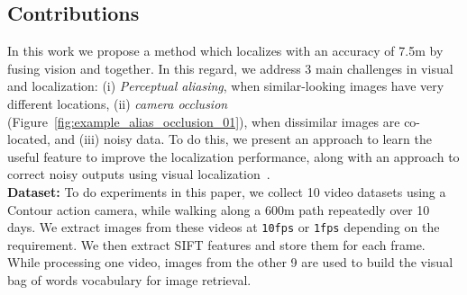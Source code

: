 \subsection{Contributions}
In this work we propose a method which localizes with an
accuracy of 7.5m by fusing vision and \gps together. 
In this regard, we address 3 main challenges in visual and \gps
localization: (i) \emph{Perceptual aliasing}, when similar-looking images
have very different \gps locations, (ii) \emph{camera occlusion}
(Figure~\ref{fig:example_alias_occlusion_01}), when dissimilar images
are co-located, and (iii) noisy \gps data. To do this, we present an approach to learn the useful feature \cite{turcot2009better,knopp2010avoiding} to improve the localization performance, along with an approach to correct noisy \gps outputs using visual localization~\cite{Zamir_2014_CVPR}.\\

\textbf{Dataset:} To do experiments in this paper, we collect
10 video datasets using a Contour action camera, while walking
along a 600m path repeatedly over 10 days. We extract images from
these videos at {\tt10fps} or {\tt1fps} depending on the requirement.
We then extract SIFT features and store them for each frame.
While processing one video, images from the other 9 are used to
build the visual bag of words vocabulary for image retrieval.

